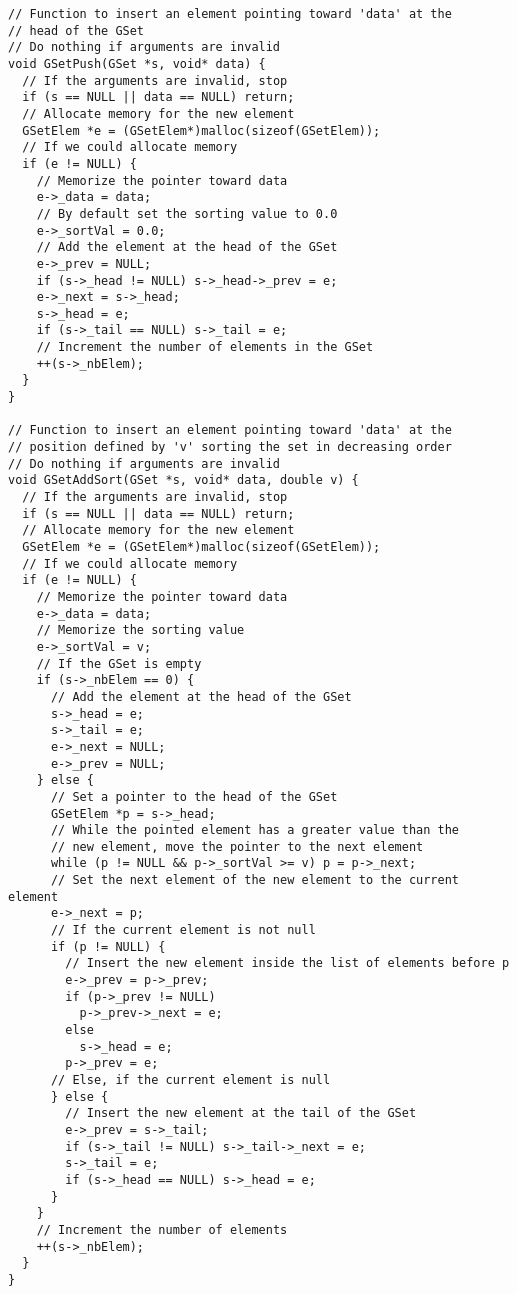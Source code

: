 \documentclass[12pt, a4paper]{article}
\begin{document}
\begin{scriptsize}
\begin{ttfamily}
\begin{lstlisting}
// Function to insert an element pointing toward 'data' at the 
// head of the GSet
// Do nothing if arguments are invalid
void GSetPush(GSet *s, void* data) {
  // If the arguments are invalid, stop
  if (s == NULL || data == NULL) return;
  // Allocate memory for the new element
  GSetElem *e = (GSetElem*)malloc(sizeof(GSetElem));
  // If we could allocate memory
  if (e != NULL) {
    // Memorize the pointer toward data
    e->_data = data;
    // By default set the sorting value to 0.0
    e->_sortVal = 0.0;
    // Add the element at the head of the GSet 
    e->_prev = NULL;
    if (s->_head != NULL) s->_head->_prev = e;
    e->_next = s->_head;
    s->_head = e;
    if (s->_tail == NULL) s->_tail = e;
    // Increment the number of elements in the GSet
    ++(s->_nbElem);
  }
}

// Function to insert an element pointing toward 'data' at the 
// position defined by 'v' sorting the set in decreasing order
// Do nothing if arguments are invalid
void GSetAddSort(GSet *s, void* data, double v) {
  // If the arguments are invalid, stop
  if (s == NULL || data == NULL) return;
  // Allocate memory for the new element
  GSetElem *e = (GSetElem*)malloc(sizeof(GSetElem));
  // If we could allocate memory
  if (e != NULL) {
    // Memorize the pointer toward data
    e->_data = data;
    // Memorize the sorting value
    e->_sortVal = v;
    // If the GSet is empty
    if (s->_nbElem == 0) {
      // Add the element at the head of the GSet
      s->_head = e;
      s->_tail = e;
      e->_next = NULL;
      e->_prev = NULL;
    } else {
      // Set a pointer to the head of the GSet
      GSetElem *p = s->_head;
      // While the pointed element has a greater value than the 
      // new element, move the pointer to the next element
      while (p != NULL && p->_sortVal >= v) p = p->_next;
      // Set the next element of the new element to the current element
      e->_next = p;
      // If the current element is not null
      if (p != NULL) {
        // Insert the new element inside the list of elements before p
        e->_prev = p->_prev;
        if (p->_prev != NULL) 
          p->_prev->_next = e;
        else
          s->_head = e;
        p->_prev = e;
      // Else, if the current element is null
      } else {
        // Insert the new element at the tail of the GSet
        e->_prev = s->_tail;
        if (s->_tail != NULL) s->_tail->_next = e;
        s->_tail = e;
        if (s->_head == NULL) s->_head = e;
      }
    }
    // Increment the number of elements
    ++(s->_nbElem);
  }
}


\end{lstlisting}
\end{ttfamily}
\end{scriptsize}
\end{document}
